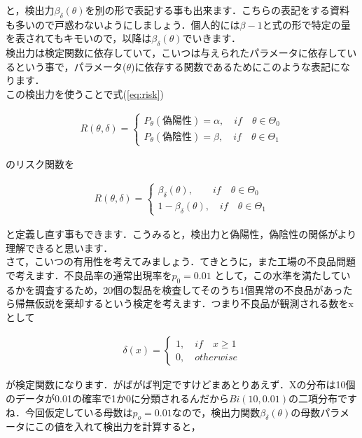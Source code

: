 \documentclass[11pt,a4paper]{ujreport} 	%
\begin{document}
と，検出力$\beta_\delta(\theta)$を別の形で表記する事も出来ます．こちらの表記をする資料も多いので戸惑わないようにしましょう．個人的には$\beta-1$と式の形で特定の量を表されてもキモいので，以降は$\beta_\delta(\theta)$でいきます．\\

検出力は検定関数に依存していて，こいつは与えられたパラメータに依存しているという事で，パラメータ($\theta$)に依存する関数であるためにこのような表記になります．\\

この検出力を使うことで式(\ref{eq:risk})

\begin{align}
  R(\theta, \delta) = 
  \left\{
    \begin{array}{l}
    P_\theta(偽陽性)=\alpha, \quad if \quad \theta \in \Theta_0\\
    P_\theta(偽陰性)=\beta, \quad if \quad \theta \in \Theta_1
    \end{array}
  \right.
\end{align}

のリスク関数を

\begin{align}
  R(\theta, \delta) = 
  \left\{
    \begin{array}{l}
    \beta_\delta(\theta), \qquad if \quad \theta \in \Theta_0\\
    1-\beta_\delta(\theta), \quad if \quad \theta \in \Theta_1
    \end{array}
  \right.
  \label{eq:risk2}
\end{align}


と定義し直す事もできます．こうみると，検出力と偽陽性，偽陰性の関係がより理解できると思います．\\


さて，こいつの有用性を考えてみましょう．てきとうに，また工場の不良品問題で考えます．不良品率の通常出現率を$p_0=0.01$
として，この水準を満たしているかを調査するため，20個の製品を検査してそのうち1個異常の不良品があったら帰無仮説を棄却するという検定を考えます．つまり不良品が観測される数をxとして

\begin{align}
  \delta(x) = 
  \left\{
    \begin{array}{l}
    1, \quad if \quad  x \geq 1\\
    0, \quad otherwise
    \end{array}
  \right.
\end{align}

が検定関数になります．がばがば判定ですけどまあとりあえず．Xの分布は10個のデータが0.01の確率で1か0に分類されるんだから$Bi(10,0.01)$の二項分布ですね．今回仮定している母数は$p_o = 0.01$なので，検出力関数$\beta_\delta(\theta)$の母数パラメータにこの値を入れて検出力を計算すると，
\end{document}
